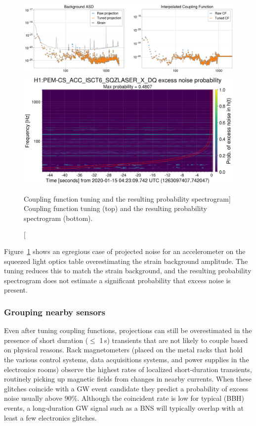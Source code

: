 \begin{figure}[h!]
	\includegraphics[width=\textwidth]{figures/noise-studies/vetting-tuning1.png}
	\includegraphics[width=\textwidth]{figures/noise-studies/vetting-tuning2.png}
	\caption
	[Coupling function tuning and the resulting probability spectrogram]
	{
		Coupling function tuning (top) and the resulting probability spectrogram (bottom).}
	\label{fig:vetting-tuning}
\end{figure}

Figure~\ref{fig:vetting-tuning} shows an egregious case of projected noise for an accelerometer on the squeezed light optics table overestimating the strain background amplitude.
The tuning reduces this to match the strain background, and the resulting probability spectrogram does not estimate a significant probability that excess noise is present.


\subsubsection{Grouping nearby sensors}

Even after tuning coupling functions, projections can still be overestimated in the presence of short duration ($\leq$ 1\,s) transients that are not likely to couple based on physical reasons.
Rack magnetometers (placed on the metal racks that hold the various control systems, data acquisitions systems, and power supplies in the electronics rooms) observe the highest rates of localized short-duration transients, routinely picking up magnetic fields from changes in nearby currents.
When these glitches coincide with a \ac{GW} event candidate they predict a probability of excess noise usually above 90\%.
Although the coincident rate is low for typical (\ac{BBH}) events, a long-duration \ac{GW} signal such as a \ac{BNS} will typically overlap with at least a few electronics glitches.

